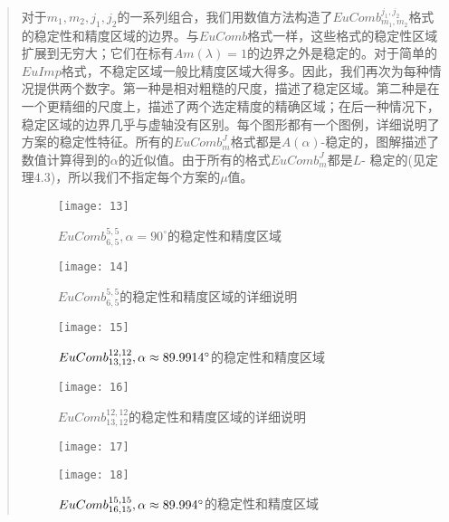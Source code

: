 \documentclass{article}
\begin{document}
\begin{CJK}{UTF8}{gkai}
\begin{quotation}
对于$m_1,m_2,j_1,j_2$的一系列组合，我们用数值方法构造了$EuComb_{m_1,m_2}^{j_1,j_2}$格式的稳定性和精度区域的边界。与$EuComb$格式一样，这些格式的稳定性区域扩展到无穷大；它们在标有$Am(\lambda)=1$的边界之外是稳定的。对于简单的$EuImp$格式，不稳定区域一般比精度区域大得多。因此，我们再次为每种情况提供两个数字。第一种是相对粗糙的尺度，描述了稳定区域。第二种是在一个更精细的尺度上，描述了两个选定精度的精确区域；在后一种情况下，稳定区域的边界几乎与虚轴没有区别。每个图形都有一个图例，详细说明了方案的稳定性特征。所有的$EuComb^J_m$格式都是$A(\alpha)$-稳定的，图解描述了数值计算得到的$\alpha$的近似值。由于所有的格式$EuComb^J_m$都是$L$- 稳定的(见定理$4.3$)，所以我们不指定每个方案的$\mu$值。\\
\begin{figure}[htbp]
	{
		\begin{minipage}{6cm}
			\centering
			\texttt{[image: 13]}
			\caption{$EuComb_{6,5}^{5,5},\alpha = 90^{\circ}$的稳定性和精度区域}
			\label{5.13}
		\end{minipage}
	}
{
		\begin{minipage}{6cm}
			\centering
			\texttt{[image: 14]}
			\caption{$EuComb_{6,5}^{5,5}$的稳定性和精度区域的详细说明}
			\label{5.14}
		\end{minipage}
	}
\end{figure}
\begin{figure}[htbp]
	{
		\begin{minipage}{6cm}
			\centering
			\texttt{[image: 15]}
			\caption{$EuComb_{13,12}^{12,12},\\ \alpha \approx 89.9914^{\circ}$的稳定性和精度区域}
			\label{5.15}
		\end{minipage}
	}
{
		\begin{minipage}{6cm}
			\centering
			\texttt{[image: 16]}
			\caption{$EuComb_{13,12}^{12,12}$的稳定性和精度区域的详细说明}
			\label{5.16}
		\end{minipage}
	}
\end{figure}
\begin{figure}[htbp]
{
		\begin{minipage}{6cm}
			\centering
			\texttt{[image: 17]}
			\caption{$EuComb_{16,15}^{15,15},\\ \alpha \approx 89.994^{\circ}$的稳定性和精度区域}
			\label{5.17}
		\end{minipage}
	}
{
		\begin{minipage}{6cm}
			\centering
			\texttt{[image: 18]}

\end{minipage}}
\end{figure}
\end{quotation}
\end{CJK}
\end{document}
